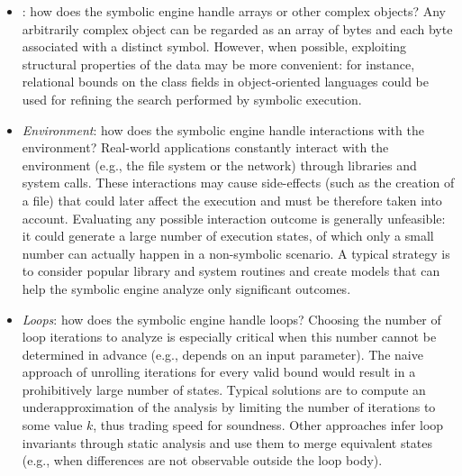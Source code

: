\begin{itemize}

\item {}: how does the symbolic engine handle arrays or other complex objects?
Any arbitrarily complex object can be regarded as an array of bytes and each byte associated with a distinct symbol. However, when possible, exploiting structural properties of the data may be more convenient: for instance, relational bounds on the class fields in object-oriented languages could be used for refining the search performed by symbolic execution.
\vspace{1mm}

  \item {\em Environment}: how does the symbolic engine handle interactions with the environment?
  Real-world applications constantly interact with the environment (e.g., the file system or the network) through libraries and system calls. These interactions may cause side-effects
(such as the creation of a file) that could later affect the execution and must be therefore taken into account. Evaluating any possible interaction outcome is generally unfeasible: it could generate a large number of execution states, of which only a small number can actually happen in a non-symbolic scenario. A typical strategy is to consider popular library and system routines and create models that can help the symbolic engine analyze only significant outcomes.
\vspace{1mm}

  \item {\em Loops}: how does the symbolic engine handle loops?
Choosing the number of loop iterations to analyze is especially critical when this number cannot be determined in advance (e.g., depends on an input parameter). The naive approach of unrolling iterations for every valid bound would result in a prohibitively large number of states. Typical solutions are to compute an underapproximation of the analysis by limiting the number of iterations to some value $k$, thus trading speed for soundness.  Other approaches infer loop invariants through static analysis  and use them to merge equivalent states (e.g., when differences are not observable outside the loop body).
\vspace{1mm}


\end{itemize}
